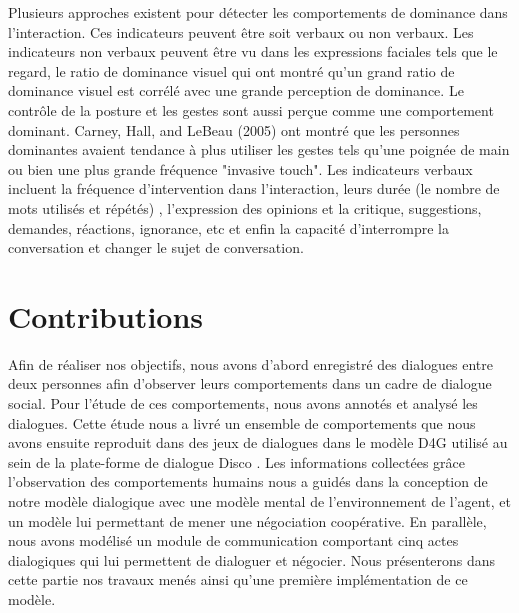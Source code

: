 \documentclass [french]{sig-alternate-05-2015}
\begin{document}
\par Plusieurs approches existent pour détecter les comportements de dominance dans l'interaction. Ces indicateurs peuvent être soit verbaux ou non verbaux. Les indicateurs non verbaux peuvent être vu dans les expressions faciales tels que le regard, le ratio de dominance visuel \cite{dunbar2005perceptions} qui ont montré qu'un grand ratio de dominance visuel est corrélé avec une grande perception de dominance. Le contrôle de la posture et les gestes sont aussi perçue comme une comportement dominant. Carney, Hall, and LeBeau (2005)  ont montré que les personnes dominantes avaient tendance à plus utiliser les gestes tels qu'une poignée de main ou bien une plus grande fréquence "invasive touch". Les indicateurs verbaux incluent la fréquence d'intervention dans l'interaction, leurs durée (le nombre de mots utilisés et répétés) \cite{dunbar2005perceptions}, l'expression des opinions et la critique, suggestions, demandes, réactions, ignorance, etc \cite{zablotskaya2012relating} et enfin la capacité d'interrompre la conversation et changer le sujet de conversation.


\section{Contributions}
\label{contribution}

\par Afin de réaliser nos objectifs, nous avons d'abord enregistré des dialogues entre deux personnes afin d'observer leurs comportements dans un cadre de dialogue social. 
Pour l'étude de ces comportements, nous avons annotés et analysé les dialogues. Cette étude nous a livré un ensemble de comportements  que nous avons ensuite reproduit dans des jeux de dialogues dans le modèle D4G utilisé au sein de la plate-forme de dialogue Disco \cite{rich2009building}. 
 Les informations collectées grâce l'observation des comportements humains nous a guidés dans la conception de notre modèle dialogique avec une modèle mental de l'environnement de l'agent, et un modèle lui permettant de mener une négociation coopérative. 
En parallèle, nous avons modélisé un module de communication comportant cinq actes dialogiques qui lui permettent de dialoguer et négocier. Nous présenterons dans cette partie nos travaux menés ainsi qu'une première implémentation de ce modèle.
\end{document}
